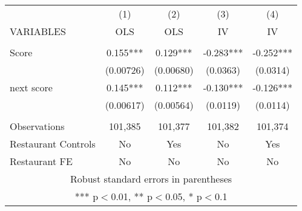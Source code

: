 \begin{tabular}{lcccc} \hline
 & (1) & (2) & (3) & (4) \\
VARIABLES & OLS & OLS & IV & IV \\ \hline
 &  &  &  &  \\
Score & 0.155*** & 0.129*** & -0.283*** & -0.252*** \\
 & (0.00726) & (0.00680) & (0.0363) & (0.0314) \\
next score & 0.145*** & 0.112*** & -0.130*** & -0.126*** \\
 & (0.00617) & (0.00564) & (0.0119) & (0.0114) \\
 &  &  &  &  \\
Observations & 101,385 & 101,377 & 101,382 & 101,374 \\
Restaurant Controls & No & Yes & No & Yes \\
 Restaurant FE & No & No & No & No \\ \hline
\multicolumn{5}{c}{ Robust standard errors in parentheses} \\
\multicolumn{5}{c}{ *** p$<$0.01, ** p$<$0.05, * p$<$0.1} \\
\end{tabular}
